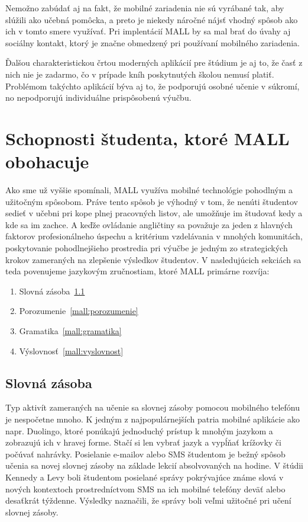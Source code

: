 \documentclass[10pt,oneside,slovak,a4paper]{article}
\begin{document}
Nemožno zabúdať aj na fakt, že mobilné zariadenia nie sú vyrábané tak, aby slúžili ako učebná pomôcka, a preto je niekedy náročné nájsť vhodný spôsob ako ich v tomto smere využívať. Pri implentácií MALL by sa mal brať do úvahy aj sociálny kontakt, ktorý je značne obmedzený pri používaní mobilného zariadenia.

Ďalšou charakteristickou črtou moderných aplikácií pre štúdium je aj to, že časť z nich nie je zadarmo, čo v prípade kníh poskytnutých školou nemusí platiť. Problémom takýchto aplikácií býva aj to, že podporujú osobné učenie v súkromí, no nepodporujú individuálne prispôsobenú výučbu.





\section{Schopnosti študenta, ktoré MALL obohacuje} \label{mall}

Ako sme už vyššie spomínali, MALL využíva mobilné technológie pohodlným a užitočným spôsobom. Práve tento spôsob je výhodný v tom, že nenúti študentov sedieť v učebni pri kope plnej pracovných listov, ale umožňuje im študovať kedy a kde sa im zachce. A keďže ovládanie angličtiny sa považuje za jeden z hlavných faktorov profesionálneho úspechu a kritérium vzdelávania v mnohých komunitách, poskytovanie pohodlnejšieho prostredia pri výučbe je jedným zo strategických krokov zameraných na zlepšenie výsledkov študentov\cite{Miangah2012}. V nasledujúcich sekciách sa teda povenujeme jazykovým zručnostiam, ktoré MALL primárne rozvíja:

\begin{enumerate}
\item Slovná zásoba~\ref{mall:slovnazasoba}
\item Porozumenie~\ref{mall:porozumenie}
\item Gramatika~\ref{mall:gramatika}
\item Výslovnosť~\ref{mall:vyslovnost}
\end{enumerate}


\subsection{Slovná zásoba} \label{mall:slovnazasoba}

Typ aktivít zameraných na učenie sa slovnej zásoby pomocou mobilného telefónu je nespočetne mnoho. K jedným z najpopulárnejších patria mobilné aplikácie ako napr. Duolingo, ktoré ponúkajú jednoduchý prístup k mnohým jazykom a zobrazujú ich v hravej forme. Stačí si len vybrať jazyk a vypĺňať krížovky či počúvať nahrávky. Posielanie e-mailov alebo SMS študentom je bežný spôsob učenia sa novej slovnej zásoby na základe lekcií absolvovaných na hodine. V štúdii Kennedy a Levy boli študentom posielané správy pokrývajúce známe slová v nových kontextoch prostredníctvom SMS na ich mobilné telefóny deväť alebo desaťkrát týždenne. Výsledky naznačili, že správy boli veľmi užitočné pri učení slovnej zásoby\cite{Kennedy2008}. 
\end{document}

